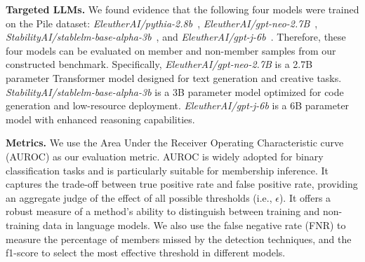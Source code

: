 
\textbf{Targeted LLMs.} We found evidence that the following four models were trained on the Pile dataset: \textit{EleutherAI/pythia-2.8b}~\cite{pilepythis}, \textit{EleutherAI/gpt-neo-2.7B}~\cite{pilegpt_neo}, \textit{StabilityAI/stablelm-base-alpha-3b}~\cite{pilestable}, and \textit{EleutherAI/gpt-j-6b}~\cite{pilegpt}. Therefore, these four models can be evaluated on member and non-member samples from our constructed benchmark. Specifically, \textit{EleutherAI/gpt-neo-2.7B} is a 2.7B parameter Transformer model designed for text generation and creative tasks. \textit{StabilityAI/stablelm-base-alpha-3b} is a 3B parameter model optimized for code generation and low-resource deployment. \textit{EleutherAI/gpt-j-6b} is a 6B parameter model with enhanced reasoning capabilities. 



\textbf{Metrics.} We use the Area Under the Receiver Operating Characteristic curve (AUROC) as our evaluation metric. AUROC is widely adopted for binary classification tasks and is particularly suitable for membership inference. It captures the trade-off between true positive rate and false positive rate, providing an aggregate judge of the effect of all possible thresholds (i.e., $\epsilon$). It offers a robust measure of a method's ability to distinguish between training and non-training data in language models. We also use the false negative rate (FNR) to measure the percentage of members missed by the detection techniques, and the f1-score to select the most effective threshold in different models.





